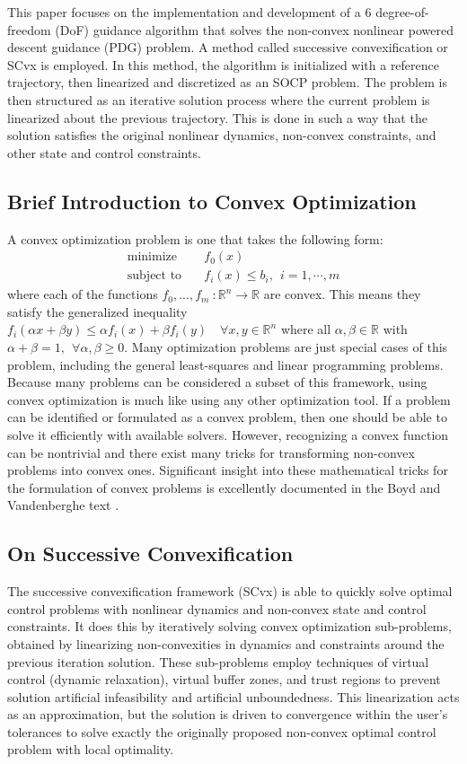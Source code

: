 \documentclass[conf]{new-aiaa}
\begin{document}
This paper focuses on the implementation and development of a 6 degree-of-freedom (DoF) guidance algorithm that solves the non-convex nonlinear powered descent guidance (PDG) problem. A method called successive convexification or SCvx is employed. In this method, the algorithm is initialized with a reference trajectory, then linearized and discretized as an SOCP problem. The problem is then structured as an iterative solution process where the current problem is linearized about the previous trajectory. This is done in such a way that the solution satisfies the original nonlinear dynamics, non-convex constraints, and other state and control constraints. 

\clearpage
\subsection{Brief Introduction to Convex Optimization}
A convex optimization problem is one that takes the following form:
\begin{align*}
	\text{minimize} \quad & f_0(x) \\ 
	\text{subject to} \quad & f_i(x) \leq b_i, \ \ i = 1, \cdots, m
\end{align*}
where each of the functions $f_0,...,f_m \ :\mathbb{R}^n \rightarrow \mathbb{R}$ are convex. This means they satisfy the generalized inequality $f_i(\alpha x + \beta y) \leq \alpha f_i(x) + \beta f_i(y) \quad \forall x, y \in \mathbb{R}^n$ where all $\alpha, \beta \in \mathbb{R}$ with $\alpha + \beta = 1,\ \ \forall \alpha,\beta \geq 0$. Many optimization problems are just special cases of this problem, including the general least-squares and linear programming problems. Because many problems can be considered a subset of this framework, using convex optimization is much like using any other optimization tool. If a problem can be identified or formulated as a convex problem, then one should be able to solve it efficiently with available solvers. However, recognizing a convex function can be nontrivial and there exist many tricks for transforming non-convex problems into convex ones. Significant insight into these mathematical tricks for the formulation of convex problems is excellently documented in the Boyd and Vandenberghe text \cite{boyd2004convex}.




\subsection{On Successive Convexification}
The successive convexification framework (SCvx) is able to quickly solve optimal control problems with nonlinear dynamics and non-convex state and control constraints. It does this by iteratively solving convex optimization sub-problems, obtained by linearizing non-convexities in dynamics and constraints around the previous iteration solution. These sub-problems employ techniques of virtual control (dynamic relaxation), virtual buffer zones, and trust regions to prevent solution artificial infeasibility and artificial unboundedness. This linearization acts as an approximation, but the solution is driven to convergence within the user's tolerances to solve exactly the originally proposed non-convex optimal control problem with local optimality.
\end{document}
